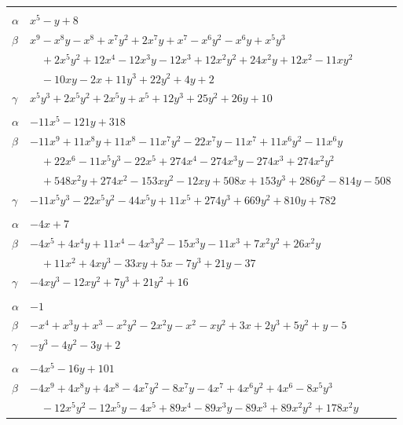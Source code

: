 \documentclass[11pt]{article}
\begin{document}
\begin{longtable}{@{}ll@{}}
\addlinespace[3pt]
\multicolumn{2}{@{}l}{$\{i,j\}=\{8,19\}$, $k_{ij}=2\cdot 3\cdot 5$}\\
$\alpha$ & $x^{5}-y+8$\\
$\beta$ & $x^{9}-x^{8}y-x^{8}+x^{7}y^{2}+2x^{7}y+x^{7}-x^{6}y^{2}-x^{6}y+x^{5}y^{3}$\\
 & $\quad +2x^{5}y^{2}+12x^{4}-12x^{3}y-12x^{3}+12x^{2}y^{2}+24x^{2}y+12x^{2}-11xy^{2}$\\
 & $\quad -10xy-2x+11y^{3}+22y^{2}+4y+2$\\
$\gamma$ & $x^{5}y^{3}+2x^{5}y^{2}+2x^{5}y+x^{5}+12y^{3}+25y^{2}+26y+10$\\
\addlinespace[3pt]
\multicolumn{2}{@{}l}{$\{i,j\}=\{8,26\}$, $k_{ij}=2^{3}\cdot 3^{3}$}\\
$\alpha$ & $-11x^{5}-121y+318$\\
$\beta$ & $-11x^{9}+11x^{8}y+11x^{8}-11x^{7}y^{2}-22x^{7}y-11x^{7}+11x^{6}y^{2}-11x^{6}y$\\
 & $\quad +22x^{6}-11x^{5}y^{3}-22x^{5}+274x^{4}-274x^{3}y-274x^{3}+274x^{2}y^{2}$\\
 & $\quad +548x^{2}y+274x^{2}-153xy^{2}-12xy+508x+153y^{3}+286y^{2}-814y-508$\\
$\gamma$ & $-11x^{5}y^{3}-22x^{5}y^{2}-44x^{5}y+11x^{5}+274y^{3}+669y^{2}+810y+782$\\
\addlinespace[3pt]
\multicolumn{2}{@{}l}{$\{i,j\}=\{8,29\}$, $k_{ij}=3^{4}$}\\
$\alpha$ & $-4x+7$\\
$\beta$ & $-4x^{5}+4x^{4}y+11x^{4}-4x^{3}y^{2}-15x^{3}y-11x^{3}+7x^{2}y^{2}+26x^{2}y$\\
 & $\quad +11x^{2}+4xy^{3}-33xy+5x-7y^{3}+21y-37$\\
$\gamma$ & $-4xy^{3}-12xy^{2}+7y^{3}+21y^{2}+16$\\
\addlinespace[3pt]
\multicolumn{2}{@{}l}{$\{i,j\}=\{8,33\}$, $k_{ij}=1$}\\
$\alpha$ & $-1$\\
$\beta$ & $-x^{4}+x^{3}y+x^{3}-x^{2}y^{2}-2x^{2}y-x^{2}-xy^{2}+3x+2y^{3}+5y^{2}+y-5$\\
$\gamma$ & $-y^{3}-4y^{2}-3y+2$\\
\addlinespace[3pt]
\multicolumn{2}{@{}l}{$\{i,j\}=\{8,34\}$, $k_{ij}=3^{2}\cdot 5\cdot 7$}\\
$\alpha$ & $-4x^{5}-16y+101$\\
$\beta$ & $-4x^{9}+4x^{8}y+4x^{8}-4x^{7}y^{2}-8x^{7}y-4x^{7}+4x^{6}y^{2}+4x^{6}-8x^{5}y^{3}$\\
 & $\quad -12x^{5}y^{2}-12x^{5}y-4x^{5}+89x^{4}-89x^{3}y-89x^{3}+89x^{2}y^{2}+178x^{2}y$\\

\end{longtable}
\end{document}
